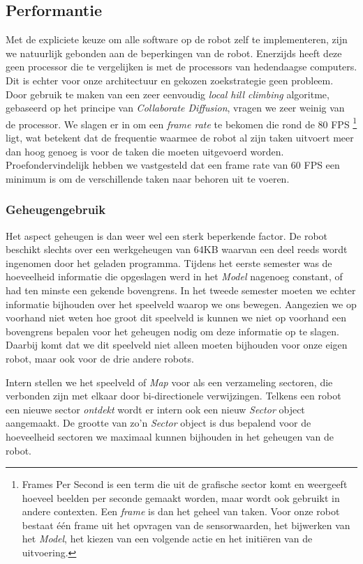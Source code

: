 \documentclass[12pt,a4paper]{report}
\begin{document}
\subsection{Performantie}
\label{sect:performance}

Met de expliciete keuze om alle software op de robot zelf te implementeren, zijn we natuurlijk gebonden aan de beperkingen van de robot. Enerzijds heeft deze geen processor die te vergelijken is met de processors van hedendaagse computers. Dit is echter voor onze architectuur en gekozen zoekstrategie geen probleem. Door gebruik te maken van een zeer eenvoudig \emph{local hill climbing} algoritme, gebaseerd op het principe van \emph{Collaborate Diffusion}, vragen we zeer weinig van de processor. We slagen er in om een \emph{frame rate} te bekomen die rond de 80 FPS \footnote{Frames Per Second is een term die uit de grafische sector komt en weergeeft hoeveel beelden per seconde gemaakt worden, maar wordt ook gebruikt in andere contexten. Een \emph{frame} is dan het geheel van taken. Voor onze robot bestaat \'e\'en frame uit het opvragen van de sensorwaarden, het bijwerken van het \emph{Model}, het kiezen van een volgende actie en het initi\"eren van de uitvoering.} ligt, wat betekent dat de frequentie waarmee de robot al zijn taken uitvoert meer dan hoog genoeg is voor de taken die moeten uitgevoerd worden. Proefondervindelijk hebben we vastgesteld dat een frame rate van 60 FPS een minimum is om de verschillende taken naar behoren uit te voeren.

\subsubsection{Geheugengebruik}

Het aspect geheugen is dan weer wel een sterk beperkende factor. De robot beschikt slechts over een werkgeheugen van 64KB waarvan een deel reeds wordt ingenomen door het geladen programma. Tijdens het eerste semester was de hoeveelheid informatie die opgeslagen werd in het \emph{Model} nagenoeg constant, of had ten minste een gekende bovengrens. In het tweede semester moeten we echter informatie bijhouden over het speelveld waarop we ons bewegen. Aangezien we op voorhand niet weten hoe groot dit speelveld is kunnen we niet op voorhand een bovengrens bepalen voor het geheugen nodig om deze informatie op te slagen. Daarbij komt dat we dit speelveld niet alleen moeten bijhouden voor onze eigen robot, maar ook voor de drie andere robots.

Intern stellen we het speelveld of \emph{Map} voor als een verzameling sectoren, die verbonden zijn met elkaar door bi-directionele verwijzingen. Telkens een robot een nieuwe sector \emph{ontdekt} wordt er intern ook een nieuw \emph{Sector} object aangemaakt. De grootte van zo'n \emph{Sector} object is dus bepalend voor de hoeveelheid sectoren we maximaal kunnen bijhouden in het geheugen van de robot.
\end{document}
